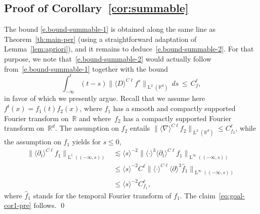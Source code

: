 \documentclass[JEP,XML,SOM,Unicode,published]{cedram}
\theoremstyle{plain}
\theoremstyle{definition}
\numberwithin{equation}{section}
\newcommand{\R}{\mathbb R}
\newcommand{\Ld}{\operatorname{L}}
\begin{document}
\subsection{Proof of Corollary~\ref{cor:summable}}
The bound \eqref{e.bound-summable-1} is obtained along the same line as Theorem~\ref{th:main-per} (using a straightforward adaptation of Lemma~\ref{lem:apriori}),
and it remains to deduce~\eqref{e.bound-summable-2}.
For that purpose, we note that~\eqref{e.bound-summable-2} would actually follow from~\eqref{e.bound-summable-1} together with the bound
\begin{equation}\label{eq:goal-cor1-pre}
\int_{-\infty}^t(t-s) \|\langle D\rangle^{C\ell} f^s\|_{\Ld^2(\R^d)}\,ds\, \le\, {C_f^\ell},
\end{equation}
in favor of which we presently argue.
Recall that we assume here $f^t(x)=f_1(t)f_2(x)$, where $f_1$ has a smooth and compactly supported Fourier transform on~$\R$ and where~$f_2$ has a compactly supported Fourier transform on~$\R^d$.
The assumption on $f_2$ entails $\|\langle\nabla\rangle^{C\ell} f_2\|_{\Ld^2(\R^d)} \le{C_{f_2}^\ell}$, while the assumption on $f_1$ yields for $s\le0$,
\begin{align*}
\|\langle\partial_t\rangle^{C\ell} f_1\|_{\Ld^1((-\infty,s))}&\lesssim\langle s\rangle^{-2}\|\langle\cdot\rangle^3\langle\partial_t\rangle^{C\ell} f_1\|_{\Ld^\infty((-\infty,s))}\\
&\le \langle s\rangle^{-2}C^\ell\|\langle\cdot\rangle^{C\ell}\langle\partial\rangle^3\hat f_1\|_{\Ld^\infty((-\infty,s))}\\
&\le \langle s\rangle^{-2}{C_{f_1}^\ell},
\end{align*}
where $\hat f_1$ stands for the temporal Fourier transform of $f_1$.
The claim~\eqref{eq:goal-cor1-pre} follows.
\qed
\end{document}
